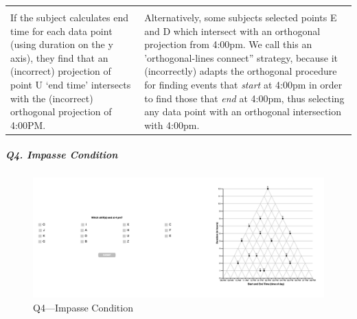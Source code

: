 \documentclass[
  letterpaper,
  DIV=11,
  numbers=noendperiod]{scrreprt}
\let\oldsubparagraph\subparagraph
\renewcommand{\subparagraph}[1]{\oldsubparagraph{#1}\mbox{}}
\begin{document}
\begin{longtable}[]{@{}
  >{\raggedright\arraybackslash}p{}
  >{\raggedright\arraybackslash}p{}@{}}
\textbar{} & \\
If the subject calculates end time for each data point (using duration
on the y axis), they find that an (incorrect) projection of point U `end
time' intersects with the (incorrect) orthogonal projection of 4:00PM. &
Alternatively, some subjects selected points E and D which intersect
with an orthogonal projection from 4:00pm. We call this an
'orthogonal-lines connect'' strategy, because it (incorrectly) adapts
the orthogonal procedure for finding events that \emph{start} at 4:00pm
in order to find those that \emph{end} at 4:00pm, thus selecting any
data point with an orthogonal intersection with 4:00pm. \\
\bottomrule()
\end{longtable}

\hypertarget{q4.-impasse-condition}{%
\subparagraph{Q4. Impasse Condition}\label{q4.-impasse-condition}}

\begin{figure}

{\centering \includegraphics{analysis/SGC3A/static/questions/Q4_121.png}

}

\caption{\label{fig-Q4-121}Q4---Impasse Condition}

\end{figure}
\end{document}
